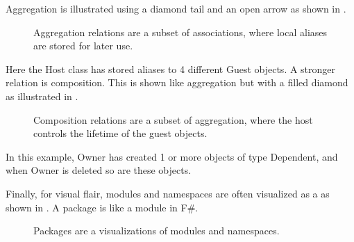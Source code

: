 Aggregation is illustrated using a diamond tail and an open arrow as shown in .
\begin{figure}
  \centering
  \caption{Aggregation relations are a subset of associations, where local aliases are stored for later use.}
  \label{fig:aggregation}
\end{figure}
Here the Host class has stored aliases to 4 different Guest objects. A stronger relation is composition. This is shown like aggregation but with a filled diamond as illustrated in .
\begin{figure}
  \centering
  \caption{Composition relations are a subset of aggregation, where the host controls the lifetime of the guest objects.}
  \label{fig:composition}
\end{figure}
In this example, Owner has created 1 or more objects of type Dependent, and when Owner is deleted so are these objects.

Finally, for visual flair, modules and namespaces are often visualized as a  as shown in . A package is like a module in F\#.
\begin{figure}
  \centering
  \caption{Packages are a visualizations of modules and namespaces.}
  \label{fig:package}
\end{figure}


